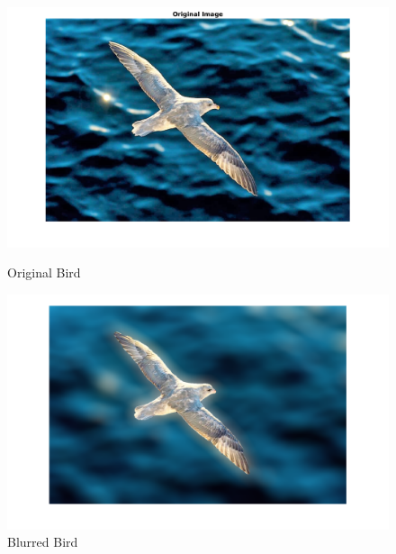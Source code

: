 \documentclass[12pt, a4paper]{article}
\begin{document}
\begin{figure}[h!]
\begin{minipage}[c][1\width]{0.45\textwidth}
    	\includegraphics[width=1.24\textwidth]{bird_original.png}
    	\null\vspace*{-28pt}
    	\caption{Original Bird}
	    \label{fig:3.7(a)}
    \end{minipage}
    \renewcommand{\thefigure}{3.7(b)}
    \begin{minipage}[c][1\width]{0.45\textwidth}
    	\includegraphics[width=1.24\textwidth]{bird_spatially_blurred.png}
    	\null\vspace*{-28pt}
    	\caption{Blurred Bird}
	    \label{fig:3.7(b)}
    \end{minipage}
\end{figure}
\newpage
\end{document}
